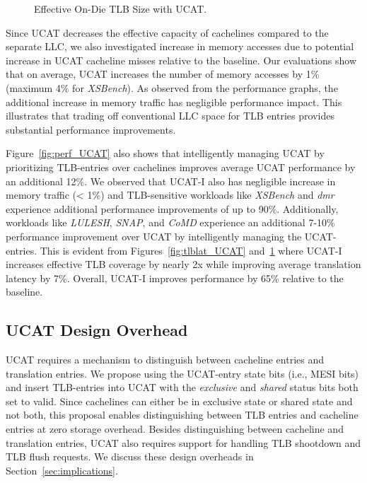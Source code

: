 \begin{figure}[b]
  \vspace{0.2in} \centering
  \centerline{}

  \caption{\small Effective On-Die TLB Size with UCAT.\normalsize}
  \label{fig:tlbsize_UCAT} 
  \vspace{-0.0 in}
\end{figure}

Since UCAT decreases the effective capacity of cachelines compared to
the separate LLC, we also investigated increase in memory accesses due
to potential increase in UCAT cacheline misses relative to the
baseline. Our evaluations show that on average, UCAT increases the
number of memory accesses by 1\% (maximum 4\% for {\em XSBench}). As
observed from the performance graphs, the additional increase in
memory traffic has negligible performance impact. This illustrates
that trading off conventional LLC space for TLB entries provides
substantial performance improvements.

Figure~\ref{fig:perf_UCAT} also shows that intelligently managing UCAT
by prioritizing TLB-entries over cachelines improves average UCAT
performance by an additional 12\%. We observed that UCAT-I also has
negligible increase in memory traffic (< 1\%) and TLB-sensitive
workloads like {\em XSBench} and {\em dmr} experience additional
performance improvements of up to 90\%. Additionally, workloads like
{\em LULESH}, {\em SNAP}, and {\em CoMD} experience an additional
7-10\% performance improvement over UCAT by intelligently managing the
UCAT-entries. This is evident from Figures~\ref{fig:tlblat_UCAT}
and~\ref{fig:tlbsize_UCAT} where UCAT-I increases effective TLB
coverage by nearly 2x while improving average translation latency by
7\%. Overall, UCAT-I improves performance by 65\% relative to the
baseline.

\subsection{UCAT Design Overhead}

\noindent UCAT requires a mechanism to distinguish between cacheline
entries and translation entries. We propose using the UCAT-entry state
bits (i.e., MESI bits) and insert TLB-entries into UCAT with the {\em
exclusive} and {\em shared} status bits both set to valid. Since
cachelines can either be in exclusive state or shared state and not
both, this proposal enables distinguishing between TLB entries and
cacheline entries at zero storage overhead. Besides distinguishing
between cacheline and translation entries, UCAT also requires support
for handling TLB shootdown and TLB flush requests. We discuss these
design overheads in Section~\ref{sec:implications}.

